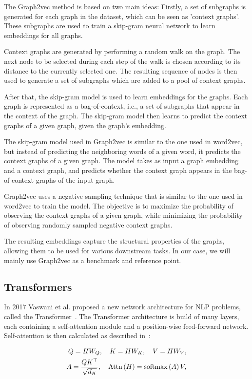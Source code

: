 The Graph2vec method is based on two main ideas: Firstly, a set of subgraphs is generated for each graph in the dataset, which can be seen as 'context graphs'. These subgraphs are used to train a skip-gram neural network to learn embeddings for all graphs.

Context graphs are generated by performing a random walk on the graph. The next node to be selected during each step of the walk is chosen according to its distance to the currently selected one. The resulting sequence of nodes is then used to generate a set of subgraphs which are added to a pool of context graphs.

After that, the skip-gram model is used to learn embeddings for the graphs. Each graph is represented as a bag-of-context, i.e., a set of subgraphs that appear in the context of the graph. The skip-gram model then learns to predict the context graphs of a given graph, given the graph's embedding.

The skip-gram model used in Graph2vec is similar to the one used in word2vec, but instead of predicting the neighboring words of a given word, it predicts the context graphs of a given graph. The model takes as input a graph embedding and a context graph, and predicts whether the context graph appears in the bag-of-context-graphs of the input graph.

Graph2vec uses a negative sampling technique that is similar to the one used in word2vec to train the model. The objective is to maximize the probability of observing the context graphs of a given graph, while minimizing the probability of observing randomly sampled negative context graphs.

The resulting embeddings capture the structural properties of the graphs, allowing them to be used for various downstream tasks. In our case, we will mainly use Graph2vec as a benchmark and reference point.

\subsection{Transformers}
In 2017 Vaswani et al. proposed a new network architecture for NLP problems, called the Transformer~\cite{vaswani2017attention}. The Transformer architecture is build of many layers, each containing a self-attention module and a position-wise feed-forward network. Self-attention is then calculated as described in~\cite{2021graphormer}:

\begin{align}
    Q = HW_Q,\quad K = HW_K,\quad V = HW_V,\label{eqn:attention-alpha} \\
    A = \frac{QK^\top}{\sqrt{d_K}}, \quad \mathrm{Attn}\left(H\right) = \mathrm{softmax}\left(A\right)V,\label{eqn:attention-alpha2}
\end{align}

